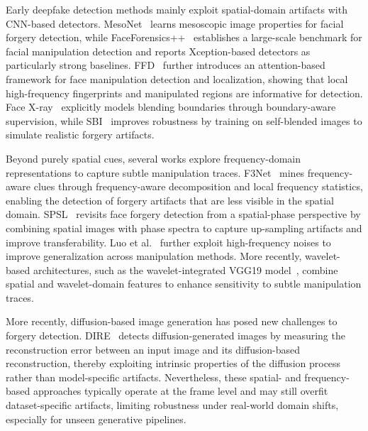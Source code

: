\documentclass[runningheads]{llncs}
\begin{document}
Early deepfake detection methods mainly exploit spatial-domain artifacts with CNN-based detectors. MesoNet~\cite{afchar2018mesonet} learns mesoscopic image properties for facial forgery detection, while FaceForensics++~\cite{rossler2019faceforensics++} establishes a large-scale benchmark for facial manipulation detection and reports Xception-based detectors as particularly strong baselines. FFD~\cite{dang2020detection} further introduces an attention-based framework for face manipulation detection and localization, showing that local high-frequency fingerprints and manipulated regions are informative for detection. Face X-ray~\cite{li2020face} explicitly models blending boundaries through boundary-aware supervision, while SBI~\cite{shiohara2022detecting} improves robustness by training on self-blended images to simulate realistic forgery artifacts.

Beyond purely spatial cues, several works explore frequency-domain representations to capture subtle manipulation traces. F3Net~\cite{qian2020thinking} mines frequency-aware clues through frequency-aware decomposition and local frequency statistics, enabling the detection of forgery artifacts that are less visible in the spatial domain. SPSL~\cite{liu2021spatial} revisits face forgery detection from a spatial-phase perspective by combining spatial images with phase spectra to capture up-sampling artifacts and improve transferability. Luo et al.~\cite{luo2021generalizing} further exploit high-frequency noises to improve generalization across manipulation methods. More recently, wavelet-based architectures, such as the wavelet-integrated VGG19 model~\cite{sadhya2024deepfake}, combine spatial and wavelet-domain features to enhance sensitivity to subtle manipulation traces.


More recently, diffusion-based image generation has posed new challenges to forgery detection. DIRE~\cite{wang2023dire} detects diffusion-generated images by measuring the reconstruction error between an input image and its diffusion-based reconstruction, thereby exploiting intrinsic properties of the diffusion process rather than model-specific artifacts. Nevertheless, these spatial- and frequency-based approaches typically operate at the frame level and may still overfit dataset-specific artifacts, limiting robustness under real-world domain shifts, especially for unseen generative pipelines.
\end{document}
